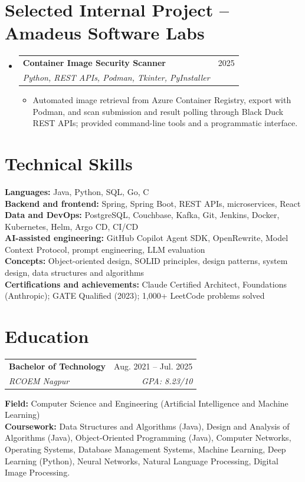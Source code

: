 \documentclass[a4paper,11pt]{article}
\makeatletter
\newcommand{\entry}[4]{\item\begin{tabularx}{\textwidth}{@{}Xr@{}}\textbf{#1}& #2\\\textit{\small #3}&\textit{\small #4}\end{tabularx}\vspace{-5pt}}
\newcommand{\bulletpoint}[1]{\item\small{#1}}
\makeatother
\begin{document}
\section{Selected Internal Project -- Amadeus Software Labs}
\begin{itemize}[leftmargin=0in,label={}]
  \entry{Container Image Security Scanner}{2025}{Python, REST APIs, Podman, Tkinter, PyInstaller}{}
  \begin{itemize}
    \bulletpoint{Automated image retrieval from Azure Container Registry, export with Podman, and scan submission and result polling through Black Duck REST APIs; provided command-line tools and a programmatic interface.}
  \end{itemize}
\end{itemize}

\section{Technical Skills}
\small\textbf{Languages:} Java, Python, SQL, Go, C \\
\textbf{Backend and frontend:} Spring, Spring Boot, REST APIs, microservices, React \\
\textbf{Data and DevOps:} PostgreSQL, Couchbase, Kafka, Git, Jenkins, Docker, Kubernetes, Helm, Argo CD, CI/CD \\
\textbf{AI-assisted engineering:} GitHub Copilot Agent SDK, OpenRewrite, Model Context Protocol, prompt engineering, LLM evaluation \\
\textbf{Concepts:} Object-oriented design, SOLID principles, design patterns, system design, data structures and algorithms \\
\textbf{Certif{}ications and achievements:} Claude Certif{}ied Architect, Foundations (Anthropic); GATE Qualif{}ied (2023); 1,000+ LeetCode problems solved

\section{Education}
\begin{tabularx}{\textwidth}{@{}Xr@{}}
  \textbf{Bachelor of Technology} & Aug. 2021 -- Jul. 2025 \\
  \textit{\small RCOEM Nagpur} & \textit{\small GPA: 8.23/10} \\
\end{tabularx}
\small\textbf{Field:} Computer Science and Engineering (Artif{}icial Intelligence and Machine Learning)\\
\small\textbf{Coursework:} Data Structures and Algorithms (Java), Design and Analysis of Algorithms (Java), Object-Oriented Programming (Java), Computer Networks, Operating Systems, Database Management Systems, Machine Learning, Deep Learning (Python), Neural Networks, Natural Language Processing, Digital Image Processing.
\end{document}
